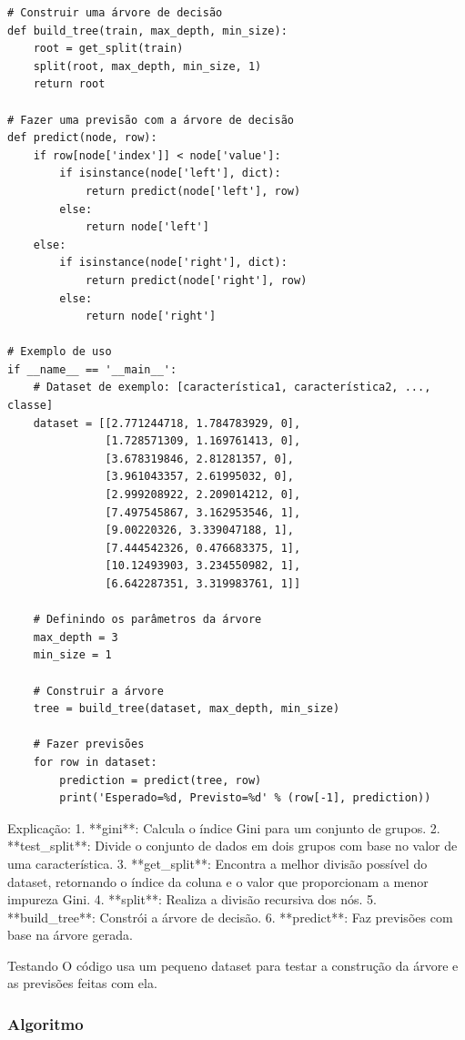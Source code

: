 \documentclass[12pt]{article}
\begin{document}
\begin{verbatim}
# Construir uma árvore de decisão
def build_tree(train, max_depth, min_size):
    root = get_split(train)
    split(root, max_depth, min_size, 1)
    return root

# Fazer uma previsão com a árvore de decisão
def predict(node, row):
    if row[node['index']] < node['value']:
        if isinstance(node['left'], dict):
            return predict(node['left'], row)
        else:
            return node['left']
    else:
        if isinstance(node['right'], dict):
            return predict(node['right'], row)
        else:
            return node['right']

# Exemplo de uso
if __name__ == '__main__':
    # Dataset de exemplo: [característica1, característica2, ..., classe]
    dataset = [[2.771244718, 1.784783929, 0],
               [1.728571309, 1.169761413, 0],
               [3.678319846, 2.81281357, 0],
               [3.961043357, 2.61995032, 0],
               [2.999208922, 2.209014212, 0],
               [7.497545867, 3.162953546, 1],
               [9.00220326, 3.339047188, 1],
               [7.444542326, 0.476683375, 1],
               [10.12493903, 3.234550982, 1],
               [6.642287351, 3.319983761, 1]]

    # Definindo os parâmetros da árvore
    max_depth = 3
    min_size = 1

    # Construir a árvore
    tree = build_tree(dataset, max_depth, min_size)

    # Fazer previsões
    for row in dataset:
        prediction = predict(tree, row)
        print('Esperado=%d, Previsto=%d' % (row[-1], prediction))
\end{verbatim}

Explicação:
1. **gini**: Calcula o índice Gini para um conjunto de grupos.
2. **test\_split**: Divide o conjunto de dados em dois grupos com base no valor de uma característica.
3. **get\_split**: Encontra a melhor divisão possível do dataset, retornando o índice da coluna e o valor que proporcionam a menor impureza Gini.
4. **split**: Realiza a divisão recursiva dos nós.
5. **build\_tree**: Constrói a árvore de decisão.
6. **predict**: Faz previsões com base na árvore gerada.

Testando
O código usa um pequeno dataset para testar a construção da árvore e as previsões feitas com ela.

\subsubsection{Algoritmo}

\end{document}
